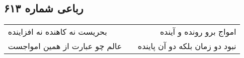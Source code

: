 \begin{center}
\section*{رباعی شماره ۶۱۳}
\label{sec:sh613}
\begin{longtable}{l p{0.5cm} r}
بحریست نه کاهنده نه افزاینده
&&
امواج برو رونده و آینده
\\
عالم چو عبارت از همین امواجست
&&
نبود دو زمان بلکه دو آن پاینده
\\
\end{longtable}
\end{center}
